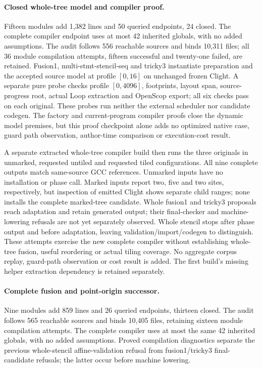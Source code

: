 \paragraph{Closed whole-tree model and compiler proof.}
Fifteen modules add 1,382 lines and 50 queried endpoints, 24 closed. The complete
compiler endpoint uses at most 42 inherited globals, with no added assumptions.
The audit follows 556 reachable sources and binds 10,311 files; all 36 module
compilation attempts, fifteen successful and twenty-one failed, are retained.
Fusion1, multi-stmt-stencil-seq and tricky3 instantiate preparation and the
accepted source model at profile $[0,16]$ on unchanged frozen Clight. A separate
pure probe checks profile $[0,4096]$, footprints, layout span, source-progress
root, actual Loop extraction and OpenScop export; all six checks pass on each
original. These probes run neither the external scheduler nor candidate codegen.
The factory and current-program compiler proofs close the dynamic model
premises, but this proof checkpoint alone adds no optimized native case, guard
path observation, author-time comparison or execution-cost result.


A separate extracted whole-tree compiler build then runs the three originals
in unmarked, requested untiled and requested tiled configurations. All nine
complete outputs match same-source GCC references. Unmarked inputs have no
installation or phase call. Marked inputs report two, five and two sites,
respectively, but inspection of emitted Clight shows separate child ranges;
none installs the complete marked-tree candidate. Whole fusion1 and tricky3
proposals reach adaptation and retain generated output; their final-checker
and machine-lowering refusals are not yet separately observed. Whole stencil
stops after phase output and before adaptation, leaving validation/import/codegen
to distinguish. These attempts exercise the new complete compiler without
establishing whole-tree fusion, useful reordering or actual tiling coverage.
No aggregate corpus replay, guard-path observation or cost result is added.
The first build's missing helper extraction dependency is retained separately.

\paragraph{Complete fusion and point-origin successor.}
Nine modules add 859 lines and 26 queried endpoints, thirteen closed. The audit
follows 565 reachable sources and binds 10,405 files, retaining sixteen module
compilation attempts. The complete compiler uses at most the same 42 inherited
globals, with no added assumptions. Proved compilation diagnostics separate
the previous whole-stencil affine-validation refusal from fusion1/tricky3
final-candidate refusals; the latter occur before machine lowering.


